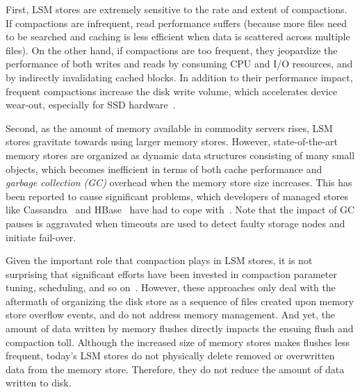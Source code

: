 First, 
LSM stores  are extremely sensitive to the rate and extent of compactions. If compactions are infrequent, read performance
suffers (because more files need to be searched and caching is less efficient when  data is scattered across multiple files). On the other hand, if 
compactions are too frequent, they jeopardize the performance of both writes and reads by consuming CPU and I/O resources, and by indirectly invalidating cached blocks. 
In addition to their performance impact, frequent compactions increase the disk write volume, which  
accelerates device wear-out, especially for SSD hardware~\cite{Hu:2009}. 

Second, as the amount of memory available in commodity servers rises, LSM stores gravitate towards using larger memory stores.
However, state-of-the-art memory stores are organized as dynamic data structures consisting of many 
small objects, which becomes inefficient in terms of both cache performance and 
\emph{garbage collection (GC)} overhead when the memory store size increases.
%
This has been reported to cause significant problems,  which developers 
  of managed stores like Cassandra~\cite{cassandra} and HBase~\cite{hbase}  have 
had to cope with~\cite{cassandraoffheap,hbasemslab}.  
Note that the impact of GC pauses is aggravated when timeouts are used to detect faulty storage nodes and initiate fail-over.



Given the important role that compaction plays in LSM stores, it is not surprising that 
significant efforts have been invested in compaction parameter tuning, scheduling, and so on~\cite{hbasetuning,
universalcompaction,scylladbcompaction,Sears:2012}. However, these approaches only deal with the aftermath
of organizing the disk store as a sequence of files created upon memory store overflow events, and do not 
address memory management. 
And yet, the amount of data written by memory flushes  
directly impacts the ensuing flush and compaction toll. 
Although the increased size of  memory stores makes flushes less frequent, 
today's LSM stores do not physically delete removed or overwritten data from the memory store. 
Therefore, they do not reduce the amount of data written to disk.

